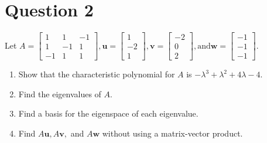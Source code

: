 \documentclass{report}
\begin{document}
\section*{Question 2}
\begin{example}
    Let
    $A = \begin{bmatrix} 1 & 1 & -1 \\ 1 & -1 & 1 \\ -1 & 1 & 1 \end{bmatrix} , \mathbf{u} = \begin{bmatrix} 1 \\ -2 \\ 1 \end{bmatrix} , \mathbf{v} = \begin{bmatrix} -2 \\ 0 \\ 2 \end{bmatrix} , \text{and}  \mathbf{w} = \begin{bmatrix} -1 \\ -1 \\ -1 \end{bmatrix}.$

    \begin{enumerate}
    \item Show that the characteristic polynomial for $A$ is $-\lambda^3 + \lambda^2 + 4\lambda - 4$.
    \item Find the eigenvalues of $A$.
    \item Find a basis for the eigenspace of each eigenvalue.
    \item Find $A\mathbf{u}, A\mathbf{v},$ and $A\mathbf{w}$ without using a matrix-vector product.
    \end{enumerate}
\end{example}
\end{document}
